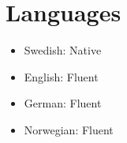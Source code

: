 \documentclass[11pt, a4paper]{article}
\begin{document}

\section*{Languages}
\begin{itemize}[noitemsep]
    \item Swedish: Native
    \item English: Fluent
    \item German: Fluent
    \item Norwegian: Fluent
\end{itemize}
\end{document}
